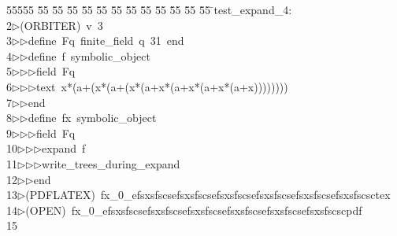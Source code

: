 %
%
\begin{tabbing}
55555 \= 55 \= 55 \= 55 \= 55 \= 55 \= 55 \= 55 \= 55 \= 55 \= 55 \= 55 \= 55 \= \>test\_expand\_4:\\[0pt]
2\>$\triangleright$\>(ORBITER)\ v\ 3\ \\[0pt]
3\>$\triangleright$\>$\triangleright$\>define\ Fq\ finite\_field\ q\ 31\ end\ \\[0pt]
4\>$\triangleright$\>$\triangleright$\>define\ f\ symbolic\_object\ \\[0pt]
5\>$\triangleright$\>$\triangleright$\>$\triangleright$\>field\ Fq\ \\[0pt]
6\>$\triangleright$\>$\triangleright$\>$\triangleright$\>text\ x*(a+(x*(a+(x*(a+x*(a+x*(a+x*(a+x))))))))\ \\[0pt]
7\>$\triangleright$\>$\triangleright$\>end\ \\[0pt]
8\>$\triangleright$\>$\triangleright$\>define\ fx\ symbolic\_object\ \\[0pt]
9\>$\triangleright$\>$\triangleright$\>$\triangleright$\>field\ Fq\ \\[0pt]
10\>$\triangleright$\>$\triangleright$\>$\triangleright$\>expand\ f\ \\[0pt]
11\>$\triangleright$\>$\triangleright$\>$\triangleright$\>write\_trees\_during\_expand\ \\[0pt]
12\>$\triangleright$\>$\triangleright$\>end\\[0pt]
13\>$\triangleright$\>(PDFLATEX)\ fx\_0\_efsxsfscsefsxsfscsefsxsfscsefsxsfscsefsxsfscsefsxsfscsctex\\[0pt]
14\>$\triangleright$\>(OPEN)\ fx\_0\_efsxsfscsefsxsfscsefsxsfscsefsxsfscsefsxsfscsefsxsfscscpdf\\[0pt]
15\>\end{tabbing}
